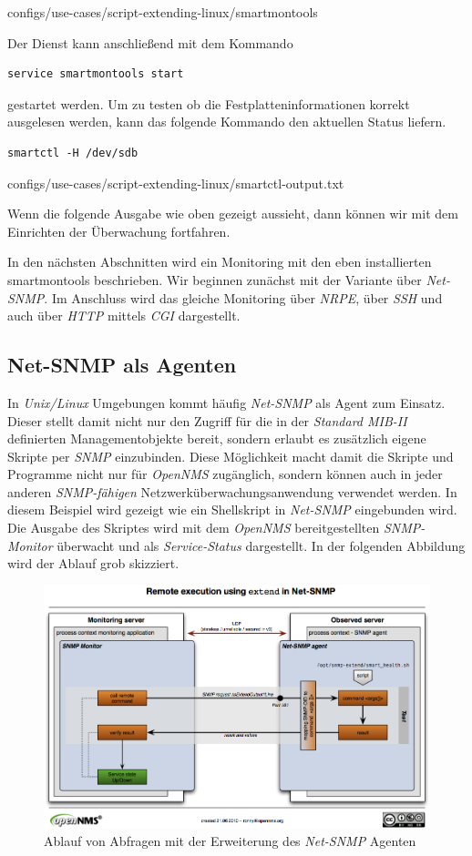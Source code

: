 
  {configs/use-cases/script-extending-linux/smartmontools}

Der Dienst kann anschließend mit dem Kommando

\begin{lstlisting}[numbers=none]
service smartmontools start
\end{lstlisting}

gestartet werden. Um zu testen ob die Festplatteninformationen korrekt ausgelesen werden, kann das folgende Kommando den aktuellen Status liefern.

\begin{lstlisting}[numbers=none]
smartctl -H /dev/sdb
\end{lstlisting}


  {configs/use-cases/script-extending-linux/smartctl-output.txt}

Wenn die folgende Ausgabe wie oben gezeigt aussieht, dann können wir mit dem Einrichten der Überwachung fortfahren.

In den nächsten Abschnitten wird ein Monitoring mit den eben installierten smartmontools beschrieben. Wir beginnen zunächst mit der Variante über \emph{Net-SNMP}. Im Anschluss wird das gleiche Monitoring über \emph{NRPE}, über \emph{SSH} und auch über \emph{HTTP} mittels \emph{CGI} dargestellt.

\subsection{Net-SNMP als Agenten}
In \emph{Unix/Linux} Umgebungen kommt häufig \emph{Net-SNMP} als Agent zum Einsatz. Dieser stellt damit nicht nur den Zugriff für die in der \emph{Standard MIB-II} definierten Managementobjekte bereit, sondern erlaubt es zusätzlich eigene Skripte per \emph{SNMP} einzubinden. Diese Möglichkeit macht damit die Skripte und Programme nicht nur für \emph{OpenNMS} zugänglich, sondern können auch in jeder anderen \emph{SNMP-fähigen} Netzwerküberwachungsanwendung verwendet werden. In diesem Beispiel wird gezeigt wie ein Shellskript in \emph{Net-SNMP} eingebunden wird. Die Ausgabe des Skriptes wird mit dem \emph{OpenNMS} bereitgestellten \emph{SNMP-Monitor} überwacht und als \emph{Service-Status} dargestellt. In der folgenden Abbildung wird der Ablauf grob skizziert.

\begin{figure}[H]
	\centering
	\includegraphics[width=1.0\textwidth]{images/use-cases/script-extending-linux/flow-netsnmp}
	\caption{Ablauf von Abfragen mit der Erweiterung des \emph{Net-SNMP} Agenten}
	\label{pic:flow-netsnmp}
\end{figure}

